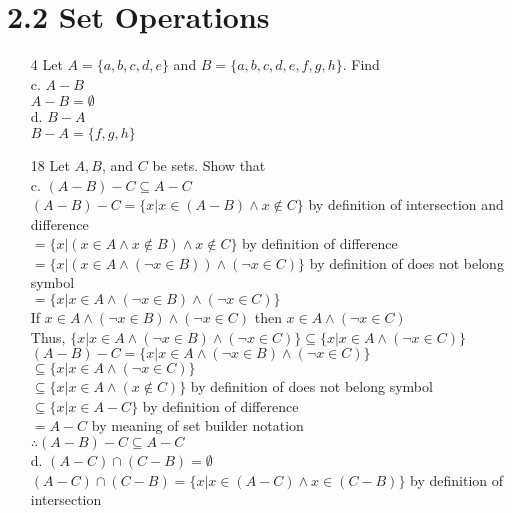 \documentclass[a4paper]{article}
\newcommand\tab[1][0.5cm]{\hspace*{#1}}
\begin{document}
\section*{2.2 Set Operations}
\begin{itemize}
  \item[4] Let $A = \{a, b, c, d, e\}$ and $B = \{a, b, c, d, e, f, g, h\}$. Find \\
    c. $A - B$ \\
    \tab $A - B = \emptyset$ \\
    d. $B - A$ \\
    \tab $B - A = \{f, g, h\}$
  \item[18] Let $A, B$, and $C$ be sets. Show that \\
    c. $(A - B) - C \subseteq A - C$ \\
    \tab $(A - B) - C = \{x|x \in (A - B) \land x \notin C\}$ by definition of intersection and difference \\
    \tab\tab\tab\tab\tab $= \{x|(x \in A \land x \notin B) \land x \notin C\}$ by definition of difference\\
    \tab\tab\tab\tab\tab $= \{x|(x \in A \land (\neg x \in B)) \land (\neg x \in C)\}$ by definition of does not belong symbol \\
    \tab\tab\tab\tab\tab $= \{x|x \in A \land (\neg x \in B) \land (\neg x \in C)\}$ \\
    \tab If $x \in A \land (\neg x \in B) \land (\neg x \in C)$ then $x \in A \land (\neg x \in C)$ \\
    \tab Thus, $\{x|x \in A \land (\neg x \in B) \land (\neg x \in C)\} \subseteq \{x|x \in A \land (\neg x \in C)\}$ \\
    \tab $(A - B) - C = \{x|x \in A \land (\neg x \in B) \land (\neg x \in C)\}$ \\
    \tab\tab\tab\tab\tab $\subseteq \{x|x \in A \land (\neg x \in C)\}$ \\
    \tab\tab\tab\tab\tab $\subseteq \{x|x \in A \land (x \notin C)\}$ by definition of does not belong symbol \\
    \tab\tab\tab\tab\tab $\subseteq \{x|x \in A - C\}$ by definition of difference \\
    \tab\tab\tab\tab\tab $= A - C$ by meaning of set builder notation \\
    \tab $\therefore (A - B) - C \subseteq A - C$ \\
    d. $(A - C) \cap (C - B) = \emptyset$ \\
    \tab $(A - C) \cap (C - B) = \{x|x \in (A - C) \land x \in (C - B)\}$ by definition of intersection \\

\end{itemize}
\end{document}
